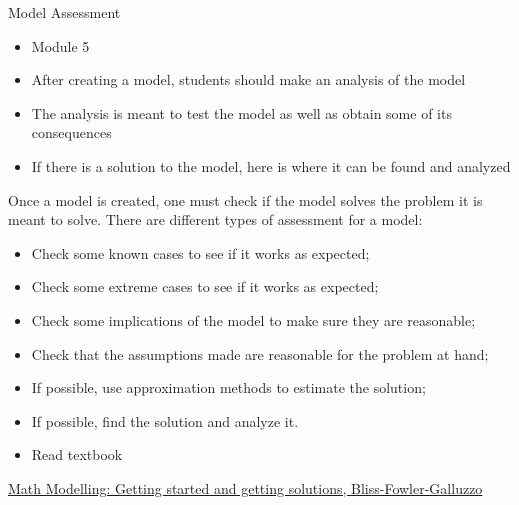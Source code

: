 \begin{module}{Model Assessment}
	\label{analysis}

\begin{siam}
	
	
\end{siam}

\end{module}




\begin{lesson}

	\begin{itemize}
		\item Module 5
	\end{itemize}

	\begin{itemize}
		\item After creating a model, students should make an analysis of the model
		\item The analysis is meant to test the model as well as obtain some of its consequences
		\item If there is a solution to the model, here is where it can be found and analyzed
	\end{itemize}
	


Once a model is created, one must check if the model solves the problem it is meant to solve.
There are different types of assessment for a model:
\begin{itemize}
	\item Check some known cases to see if it works as expected;
	\item Check some extreme cases to see if it works as expected;
	\item Check some implications of the model to make sure they are reasonable;
	\item Check that the assumptions made are reasonable for the problem at hand;
	\item If possible, use approximation methods to estimate the solution;
	\item If possible, find the solution and analyze it.
\end{itemize}


\begin{itemize}
	\item Read textbook
\end{itemize}


\begin{annotation}
	\begin{goals}
	\end{goals}
\end{annotation}
	 \href{https://m3challenge.siam.org/resources/modeling-handbook}{Math Modelling: Getting started and getting solutions, Bliss-Fowler-Galluzzo}

\end{lesson}




